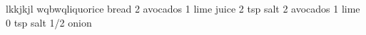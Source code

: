 lkkjkjl
wqbwqliquorice
bread
2 avocados 
1 lime juice
2 tsp salt
2 avocados 
1 lime
0 tsp salt
1/2 onion

